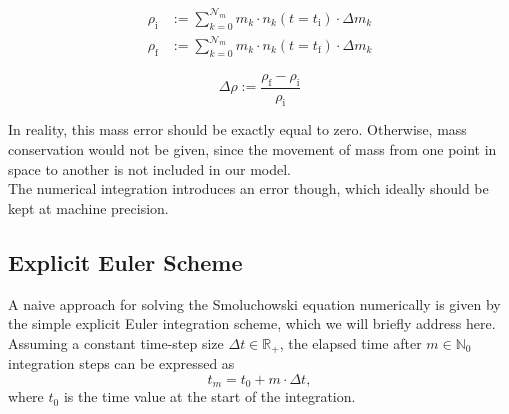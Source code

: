          \\

         \\ %


        \begin{align}
            \rho_\text{i}
                &:=\sum_{k=0}^{\mathcal N_m} m_k\cdot n_k(t=t_\text{i})\cdot\Delta m_k
            \\
            \rho_\text{f}
                &:=\sum_{k=0}^{\mathcal N_m} m_k\cdot n_k(t=t_\text{f})\cdot\Delta m_k
        \end{align}

        
        \begin{equation}
            \Delta\rho
                :=\frac{\rho_\text{f}-\rho_\text{i}}{\rho_\text{i}}
        \end{equation}

        In reality, this mass error should be exactly equal to zero. Otherwise, mass conservation would not be given, since the movement of mass from one point in space to another is not included in our model. \\
        
        The numerical integration introduces an error though, which ideally should be kept at machine precision. %

    \subsection{Explicit Euler Scheme}

        A naive approach for solving the Smoluchowski equation numerically is given by the simple 
        explicit Euler integration scheme, which we will briefly address here. Assuming a constant 
        time-step size $\Delta t\in\mathbb R_+$, the elapsed time after $m\in\mathbb N_0$ integration 
        steps can be expressed as 
        \begin{equation}
            t_m
                =t_0+m\cdot\Delta t,
        \end{equation}
        where $t_0$ is the time value at the start of the integration.\\
        
